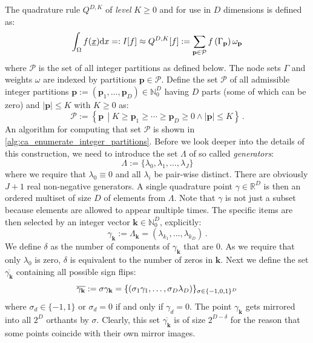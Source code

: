 \documentclass[a4paper,10pt]{article}
\begin{document}
The quadrature rule $Q^{D,K}$ of \emph{level} $K \geq 0$ and
for use in $D$ dimensions is defined as:
\begin{equation} \label{eq:gk_basic_formula}
  \int_\Omega f(\underline{x}) \mathrm{d}x =:
  I[f] \approx Q^{D,K}[f]
       := \sum_{\mathbf{p} \in \mathcal{P}}
            f\left(\Gamma_{\mathbf{p}}\right)
            \omega_{\mathbf{p}}
\end{equation}
where $\mathcal{P}$ is the set of all integer partitions as defined below.
The node sets $\Gamma$ and weights $\omega$ are indexed by partitions
$\mathbf{p} \in \mathcal{P}$.
Define the set $\mathcal{P}$ of all admissible integer partitions
$\mathbf{p} := (\mathbf{p}_{1}, \ldots, \mathbf{p}_{D}) \in \mathbb{N}_{0}^{D}$
having $D$ parts (some of which can be zero) and $|\mathbf{p}| \leq K$
with $K \geq 0$ as:
\begin{equation} \label{eq:partition_set_def}
  \mathcal{P} :=
  \left\{
    \mathbf{p} \,
    \middle| K \geq \mathbf{p}_{1} \geq \cdots \geq \mathbf{p}_{D} \geq 0
    \wedge
    |\mathbf{p}| \leq K
  \right\}
  \,.
\end{equation}
An algorithm for computing that set $\mathcal{P}$
is shown in \eqref{alg:ca_enumerate_integer_partitions}.
Before we look deeper into the details of this construction,
we need to introduce the set $\Lambda$ of so called \emph{generators}:
\begin{equation}
  \Lambda := \{\lambda_{0}, \lambda_{1}, \ldots, \lambda_{J}\}
\end{equation}
where we require that $\lambda_{0} \equiv 0$ and all $\lambda_{i}$ be
pair-wise distinct. There are obviously $J+1$ real non-negative generators.
A single quadrature point $\gamma \in \mathbb{R}^D$ is then an ordered
multiset of size $D$ of elements from $\Lambda$. Note that $\gamma$ is not
just a subset because elements are allowed to appear multiple times. The
specific items are then selected by an integer vector $\mathbf{k} \in \mathbb{N}_0^D$,
explicitly:
\begin{equation}
  \gamma_\mathbf{k} := \Lambda_\mathbf{k} = \left(\lambda_{k_1}, \ldots, \lambda_{k_D}\right) \,.
\end{equation}
We define $\delta$ as the number of components of $\gamma_\mathbf{k}$ that are 0.
As we require that only $\lambda_0$ is zero, $\delta$ is equivalent to the number
of zeros in $\mathbf{k}$.
Next we define the set $\overline{\gamma_\mathbf{k}}$ containing all
possible sign flips:
\begin{equation}
  \overline{\gamma_\mathbf{k}} :=
  \sigma \gamma_\mathbf{k} =
  \{
  \left(\sigma_1 \gamma_1, \ldots, \sigma_D \lambda_D\right)
  \}_{\sigma \in \{-1,0,1\}^D}
\end{equation}
where $\sigma_d \in \{-1, 1\}$ or $\sigma_d = 0$ if and only if $\gamma_d = 0$.
The point $\gamma_\mathbf{k}$ gets mirrored into all $2^D$ orthants by $\sigma$.
Clearly, this set $\overline{\gamma_\mathbf{k}}$ is of size $2^{D-\delta}$ for
the reason that some points coincide with their own mirror images.
\end{document}
